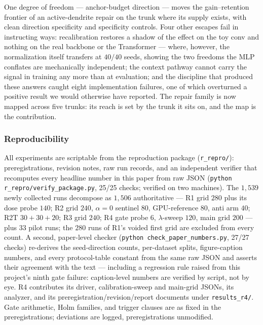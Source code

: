 \documentclass[10pt]{article}
\begin{document}
One degree of freedom --- anchor-budget direction --- moves the
gain--retention frontier of an active-dendrite repair on the trunk where
its supply exists, with clean direction specificity and specificity
controls. Four other escapes fail in instructing ways: recalibration
restores a shadow of the effect on the toy conv and nothing on the real
backbone or the Transformer --- where, however, the normalization itself
transfers at $40/40$ seeds, showing the two freedoms the MLP conflates
are mechanically independent; the context pathway cannot carry the
signal in training any more than at evaluation; and the discipline that
produced these answers caught eight implementation failures, one of
which overturned a positive result we would otherwise have reported.
The repair family is now mapped across five trunks: its reach
is set by the trunk it sits on, and the map is the contribution.

\subsubsection*{Reproducibility}
All experiments are scriptable from the reproduction package
(\texttt{r\_repro/}): preregistrations, revision notes, raw run records,
and an independent verifier that recomputes every headline number in this
paper from raw JSON (\texttt{python r\_repro/verify\_package.py}, 25/25
checks; verified on two machines). The $1{,}539$ newly collected runs
decompose as $1{,}506$ authoritative --- R1 grid $280$ plus its dose
probe $140$; R2 grid $240$, $\alpha{=}0$ sentinel $80$, GPU-reference
$80$, anti arm $40$; R2T $30{+}30{+}20$; R3 grid $240$; R4 gate probe
$6$, $\lambda$-sweep $120$, main grid $200$ --- plus $33$
pilot runs; the $280$ runs of R1's voided first grid are excluded from
every count. A second, paper-level checker
(\texttt{python check\_paper\_numbers.py}, 27/27 checks) re-derives the
seed-direction counts, per-dataset splits, figure-caption numbers, and
every protocol-table constant from
the same raw JSON and asserts their agreement with the text --- including
a regression rule raised from this project's ninth gate failure:
caption-level numbers are verified by script, not by eye. R4 contributes
its driver, calibration-sweep and main-grid JSONs, its analyzer, and its
preregistration/revision/report documents under \texttt{results\_r4/}.
Gate
arithmetic, Holm families, and trigger clauses are as fixed in the
preregistrations; deviations are logged, preregistrations unmodified.



\end{document}
